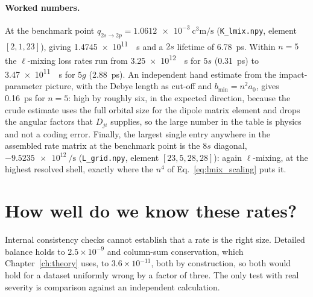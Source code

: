 \paragraph{Worked numbers.} At the benchmark point
$q_{2s\to2p} = \SI{1.0612e-3}{\cubic\centi\metre\per\second}$
(\texttt{K\_lmix.npy}, element $[2,1,23]$), giving
\SI{1.4745e11}{\per\second} and a $2s$ lifetime of \SI{6.78}{\pico\second}.
Within $n=5$ the $\ell$-mixing loss rates run from \SI{3.25e12}{\per\second} for
$5s$ (\SI{0.31}{\pico\second}) to \SI{3.47e11}{\per\second} for $5g$
(\SI{2.88}{\pico\second}). An independent hand estimate from the
impact-parameter picture, with the Debye length as cut-off and
$b_{\min} = n^{2}a_0$, gives \SI{0.16}{\pico\second} for $n=5$: high by roughly
six, in the expected direction, because the crude estimate uses the full orbital
size for the dipole matrix element and drops the angular factors that $D_{ji}$
supplies, so the large number in the table is physics and not a coding error.
Finally, the largest single entry anywhere in the assembled rate matrix at the
benchmark point is the $8s$ diagonal, $-\SI{9.5235e12}{\per\second}$
(\texttt{L\_grid.npy}, element $[23,5,28,28]$): again $\ell$-mixing, at the
highest resolved shell, exactly where the $n^{4}$ of
Eq.~\eqref{eq:lmix_scaling} puts it.

\section{How well do we know these rates?}
\label{sec:atomic_uncertainty}

Internal consistency checks cannot establish that a rate is the right size.
Detailed balance holds to $2.5\times10^{-9}$ and column-sum conservation, which
Chapter~\ref{ch:theory} uses, to $3.6\times10^{-11}$, both by construction, so
both would hold for a dataset uniformly wrong by a factor of three. The only
test with real severity is comparison against an independent calculation.

